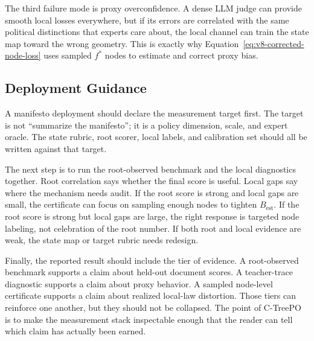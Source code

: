 The third failure mode is proxy overconfidence. A dense LLM judge can provide
smooth local losses everywhere, but if its errors are correlated with the
same political distinctions that experts care about, the local channel can
train the state map toward the wrong geometry. This is exactly why
Equation~\eqref{eq:v8-corrected-node-loss} uses sampled \(f^\ast\) nodes to
estimate and correct proxy bias.

\subsection{Deployment Guidance}

A manifesto deployment should declare the measurement target first. The target
is not ``summarize the manifesto''; it is a policy dimension, scale, and expert
oracle. The state rubric, root scorer, local labels, and calibration set should
all be written against that target.

The next step is to run the root-observed benchmark and the local diagnostics
together. Root correlation says whether the final score is useful. Local gaps
say where the mechanism needs audit. If the root score is strong and local
gaps are small, the certificate can focus on sampling enough nodes to tighten
\(B_{\mathrm{est}}\). If the root score is strong but local gaps are large,
the right response is targeted node labeling, not celebration of the root
number. If both root and local evidence are weak, the state map or target
rubric needs redesign.

Finally, the reported result should include the tier of evidence. A
root-observed benchmark supports a claim about held-out document scores. A
teacher-trace diagnostic supports a claim about proxy behavior. A sampled
node-level certificate supports a claim about realized local-law distortion.
Those tiers can reinforce one another, but they should not be collapsed. The
point of C-TreePO is to make the measurement stack inspectable enough that the
reader can tell which claim has actually been earned.
